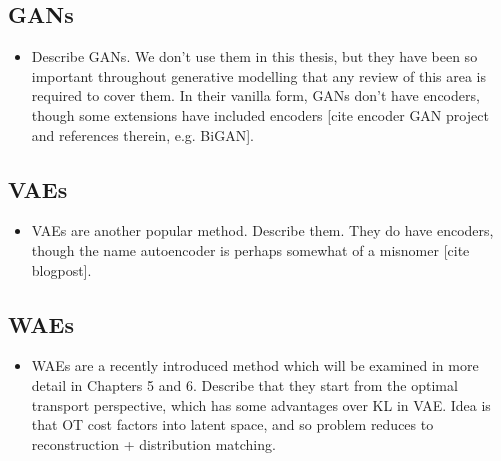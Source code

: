 \subsection{GANs}

\begin{itemize}
\item Describe GANs. We don't use them in this thesis, but they have been so important throughout generative modelling that any review of this area is required to cover them. In their vanilla form, GANs don't have encoders, though some extensions have included encoders [cite encoder GAN project and references therein, e.g. BiGAN].
\end{itemize}

\subsection{VAEs}

\begin{itemize}
\item VAEs are another popular method. Describe them. They do have encoders, though the name autoencoder is perhaps somewhat of a misnomer [cite blogpost].
\end{itemize}

\subsection{WAEs}

\begin{itemize}
\item WAEs are a recently introduced method which will be examined in more detail in Chapters 5 and 6. Describe that they start from the optimal transport perspective, which has some advantages over KL in VAE. Idea is that OT cost factors into latent space, and so problem reduces to reconstruction + distribution matching. 
\end{itemize}






